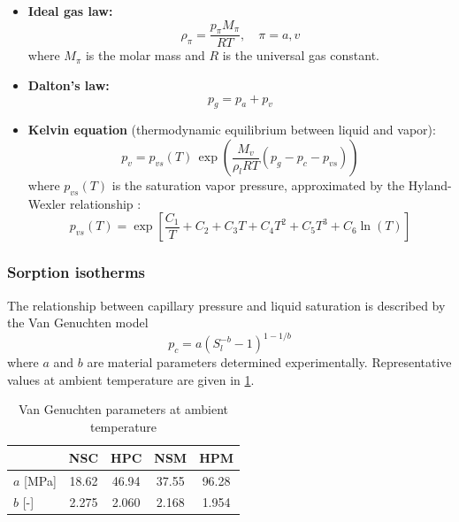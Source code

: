 \begin{itemize}
    \item \textbf{Ideal gas law:}
    \begin{equation}
        \rho_\pi = \frac{p_\pi M_\pi}{RT}, \quad \pi = a, v \label{eq:ideal_gas}
    \end{equation}
    where $M_\pi$ is the molar mass and $R$ is the universal gas constant.
    
    \item \textbf{Dalton's law:}
    \begin{equation}
        p_g = p_a + p_v \label{eq:dalton}
    \end{equation}
    
    \item \textbf{Kelvin equation} (thermodynamic equilibrium between liquid and vapor):
    \begin{equation}
        p_v = p_{vs}(T)\,\exp\left(\frac{M_v}{\rho_l R T} (p_g - p_c - p_{vs})\right) \label{eq:kelvin}
    \end{equation}
    where $p_{vs}(T)$ is the saturation vapor pressure, approximated by the Hyland-Wexler relationship \cite{dauti2018}:
    \begin{equation}
        p_{vs}(T) = \exp\left[\frac{C_1}{T} + C_2 + C_3 T + C_4 T^2 + C_5 T^3 + C_6 \ln(T)\right] \label{eq:pvs}
    \end{equation}
\end{itemize}

\subsubsection{Sorption isotherms}

The relationship between capillary pressure and liquid saturation is described by the Van Genuchten model \begin{equation}
    p_c = a\left(S_l^{-b} - 1\right)^{1-1/b} \label{eq:VG}
\end{equation}
where $a$ and $b$ are material parameters determined experimentally. Representative values at ambient temperature are given in \cref{tab:VG}.

\begin{table}[h]
    \centering
    \caption{Van Genuchten parameters at ambient temperature} 
    \label{tab:VG}
    \begin{tabular}{lcccc}
    \hline
    & NSC & HPC & NSM & HPM \\
    \hline
    $a$ [MPa] & 18.62 & 46.94 & 37.55 & 96.28 \\
    $b$ [-]   & 2.275 & 2.060 & 2.168 & 1.954 \\
    \hline
    \end{tabular}
\end{table}

